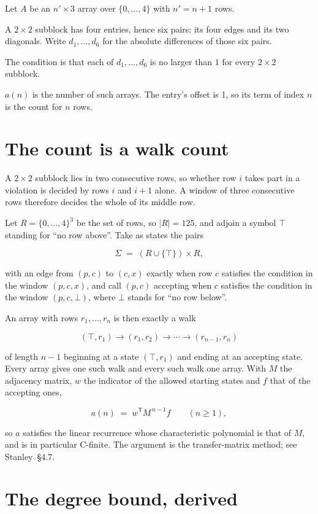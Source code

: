 \documentclass[11pt]{article}
\theoremstyle{definition}
\begin{document}
Let $A$ be an $n' \times 3$ array over $\{0,\dots,4\}$ with $n' = n + 1$ rows.

A $2\times2$ subblock has four entries, hence six pairs: its four edges and its two diagonals. Write $d_1,\dots,d_6$ for the absolute differences of those six pairs.

The condition is that each of $d_1,\dots,d_6$ is no larger than $1$ for every $2\times2$ subblock.

$a(n)$ is the number of such arrays. The entry's offset is 1, so its term of index $n$ is the count for $n$ rows.

\section{The count is a walk count}

A $2\times2$ subblock lies in two consecutive rows, so whether row $i$ takes part in a violation is decided by rows $i$ and $i+1$ alone. A window of three consecutive rows therefore decides the whole of its middle row.

Let $R = \{0,\dots,4\}^{3}$ be the set of rows, so $|R| = 125$, and adjoin a symbol $\top$ standing for ``no row above''. Take as states the pairs

\[\Sigma \;=\; (R \cup \{\top\}) \times R,\]

with an edge from $(p,c)$ to $(c,x)$ exactly when row $c$ satisfies the condition in the window $(p,c,x)$, and call $(p,c)$ accepting when $c$ satisfies the condition in the window $(p,c,\bot)$, where $\bot$ stands for ``no row below''.

An array with rows $r_1,\dots,r_n$ is then exactly a walk

\[(\top,r_1) \to (r_1,r_2) \to \cdots \to (r_{n-1},r_n)\]

of length $n-1$ beginning at a state $(\top,r_1)$ and ending at an accepting state. Every array gives one such walk and every such walk one array. With $M$ the adjacency matrix, $w$ the indicator of the allowed starting states and $f$ that of the accepting ones,

\[a(n) \;=\; w^{\mathsf T} M^{\,n-1} f \qquad (n \ge 1),\]

so $a$ satisfies the linear recurrence whose characteristic polynomial is that of $M$, and is in particular C-finite. The argument is the transfer-matrix method; see Stanley~\S4.7.

\section{The degree bound, derived}
\end{document}
